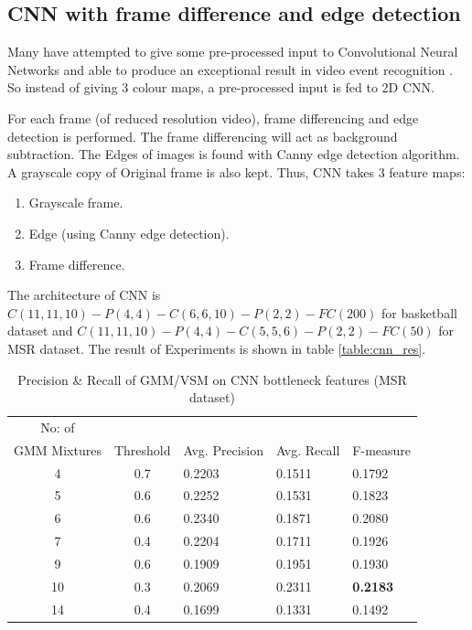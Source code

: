 \subsection{CNN with frame difference and edge detection}

Many have attempted to give some pre-processed input to Convolutional Neural Networks and able to produce an exceptional result in video event recognition \citep{ji20133d}. So instead of giving 3 colour maps, a pre-processed input is fed to 2D CNN.

For each frame (of reduced resolution video), frame differencing and edge detection is performed. The frame differencing will act as background subtraction. The Edges of images is found with Canny edge detection algorithm. A grayscale copy of Original frame is also kept. Thus, CNN takes 3 feature maps:
\begin{enumerate}
\item Grayscale frame.
\item Edge (using Canny edge detection).
\item Frame difference.
\end{enumerate}

The architecture of CNN is $C(11, 11, 10)-P(4, 4)-C(6, 6, 10)-P(2, 2)-FC(200)$ for basketball dataset and $C(11, 11, 10)-P(4,4)-C(5, 5, 6)-P(2,2)-FC(50)$ for MSR dataset. The result of Experiments is shown in table \ref{table:cnn_res}.

\begin{table}[h]
\centering
\begin{tabular}{|c|c|l|l|l|}
\hline
No: of &&&&\\
GMM Mixtures & Threshold & Avg. Precision & Avg. Recall & F-measure\\
\hline
\hline
 4 	&0.7 	&0.2203 	& 0.1511	&0.1792\\
 5 	&0.6 	&0.2252 	& 0.1531	&0.1823\\
 6 	&0.6 	&0.2340 	& 0.1871	&0.2080\\
 7 	&0.4 	&0.2204 	& 0.1711	&0.1926\\
 9 	&0.6 	&0.1909 	& 0.1951	&0.1930\\
10 	&0.3 	&0.2069 	& 0.2311	&\textbf{0.2183}\\
14 	&0.4 	&0.1699 	& 0.1331	&0.1492\\
\hline  
\end{tabular}
\caption[Event spotting using GMM/VSM on CNN(Gray,Frame diff,Edge) bottleneck features (MSR Action Dataset) ]{ Precision \& Recall  of GMM/VSM on CNN bottleneck features (MSR dataset)}
\label{table:cnn_gmm_res_msr}
\end{table} 

